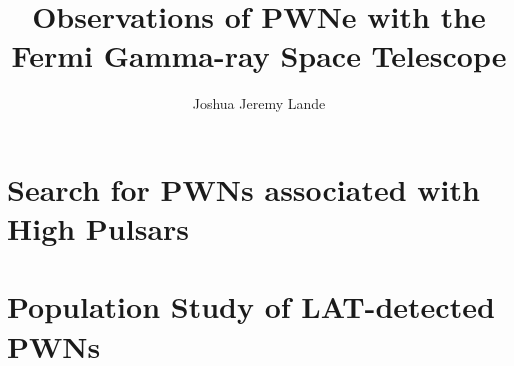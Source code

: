 \documentclass[12pt]{report}
\title{Observations of PWNe with the Fermi Gamma-ray Space Telescope}
\author{Joshua Jeremy Lande}
\begin{document}
\listoftodos
\newpage
 


\beforepreface


\afterpreface




\acresetall















\chapter{Search for \acsp{PWN} associated with High \edot Pulsars}

\chapter{Population Study of LAT-detected \acsp{PWN}}


\appendix

%
%
%





\end{document}
